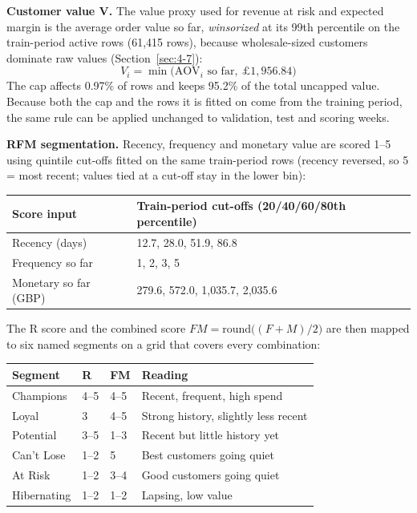 \textbf{Customer value V.} The value proxy used for revenue at risk and expected margin is the average order value so far, \emph{winsorized} at its 99th percentile on the train-period active rows (61,415 rows), because wholesale-sized customers dominate raw values (Section~\ref{sec:4-7}):
\begin{equation*}
    V_i = \min\big(\text{AOV}_i \text{ so far},\ \pounds1{,}956.84\big)
\end{equation*}
The cap affects 0.97\% of rows and keeps 95.2\% of the total uncapped value. Because both the cap and the rows it is fitted on come from the training period, the same rule can be applied unchanged to validation, test and scoring weeks.

\textbf{RFM segmentation.} Recency, frequency and monetary value are scored 1--5 using quintile cut-offs fitted on the same train-period rows (recency reversed, so 5 = most recent; values tied at a cut-off stay in the lower bin):

\begin{center}
\begin{tabular}{@{}p{3.6cm}p{8cm}@{}}
    \toprule
    Score input & Train-period cut-offs (20/40/60/80th percentile) \\
    \midrule
    Recency (days) & 12.7, 28.0, 51.9, 86.8 \\
    Frequency so far & 1, 2, 3, 5 \\
    Monetary so far (GBP) & 279.6, 572.0, 1,035.7, 2,035.6 \\
    \bottomrule
\end{tabular}
\end{center}

The R score and the combined score $FM = \text{round}\big((F + M)/2\big)$ are then mapped to six named segments on a grid that covers every combination:

\begin{center}
\begin{tabular}{@{}p{2.6cm}p{1.6cm}p{1.6cm}p{7.2cm}@{}}
    \toprule
    Segment & R & FM & Reading \\
    \midrule
    Champions & 4--5 & 4--5 & Recent, frequent, high spend \\
    Loyal & 3 & 4--5 & Strong history, slightly less recent \\
    Potential & 3--5 & 1--3 & Recent but little history yet \\
    Can't Lose & 1--2 & 5 & Best customers going quiet \\
    At Risk & 1--2 & 3--4 & Good customers going quiet \\
    Hibernating & 1--2 & 1--2 & Lapsing, low value \\
    \bottomrule
\end{tabular}
\end{center}

